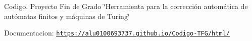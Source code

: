
\begin{DoxyItemize}
\item Codigo. Proyecto Fin de Grado \char`\"{}\+Herramienta para la corrección automática de autómatas finitos y máquinas de Turing\char`\"{}
\end{DoxyItemize}

Documentacion\+: \href{https://alu0100693737.github.io/Codigo-TFG/html/}{\tt https\+://alu0100693737.\+github.\+io/\+Codigo-\/\+T\+F\+G/html/}

   